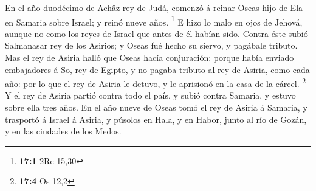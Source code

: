  En el año duodécimo de Achâz rey de Judá, comenzó á
reinar Oseas hijo de Ela en Samaria sobre Israel; y reinó nueve años.
\footnote{\textbf{17:1} 2Re 15,30}  E hizo lo malo en ojos
de Jehová, aunque no como los reyes de Israel que antes de él habían
sido.  Contra éste subió Salmanasar rey de los Asirios; y
Oseas fué hecho su siervo, y pagábale tributo.  Mas el rey
de Asiria halló que Oseas hacía conjuración: porque había enviado
embajadores á So, rey de Egipto, y no pagaba tributo al rey de Asiria,
como cada año: por lo que el rey de Asiria le detuvo, y le aprisionó en
la casa de la cárcel. \footnote{\textbf{17:4} Os 12,2}  Y
el rey de Asiria partió contra todo el país, y subió contra Samaria, y
estuvo sobre ella tres años.  En el año nueve de Oseas
tomó el rey de Asiria á Samaria, y trasportó á Israel á Asiria, y
púsolos en Hala, y en Habor, junto al río de Gozán, y en las ciudades de
los Medos.

